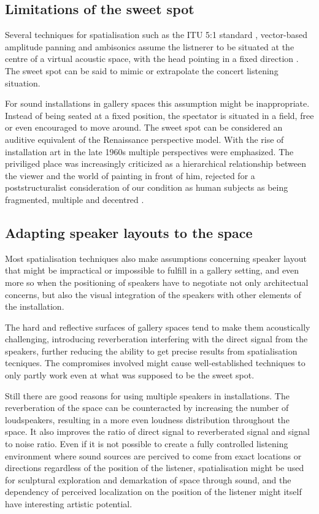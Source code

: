 \documentclass{article}
\begin{document}
\subsection{Limitations of the sweet spot}

Several techniques for spatialisation such as the ITU 5:1 standard \cite{ITU:1993_surround_5:1}, vector-based amplitude panning \cite{Pulkki:1997vbap} and ambisonics \cite{Gerzon:1985ambi_broadcast,Gerzon:1992metatheory} assume the listnerer to be situated at the centre of a virtual acoustic space, with the head pointing in a fixed direction \cite{Wishart:1996sonic_art}. The sweet spot can be said to mimic or extrapolate the concert listening situation.

For sound installations in gallery spaces this assumption might be inappropriate. Instead of being seated at a fixed position, the spectator is situated in a field, free or even encouraged to move around. The sweet spot can be considered an auditive equivalent of the Renaissance perspective model. With the rise of installation art in the late 1960s multiple perspectives were emphasized. The priviliged place was increasingly criticized as a hierarchical relationship between the viewer and the world of painting in front of him, rejected for a poststructuralist consideration of our condition as human subjects as being fragmented, multiple and decentred \cite{Bishop:2005installation}.


\subsection{Adapting speaker layouts to the space}

Most spatialisation techniques also make assumptions concerning speaker layout that might be impractical or impossible to fulfill in a gallery setting, and even more so when the positioning of speakers have to negotiate not only architectual concerns, but also the visual integration of the speakers with other elements of the installation.

The hard and reflective surfaces of gallery spaces tend to make them acoustically challenging, introducing reverberation interfering with the direct signal from the speakers, further reducing the ability to get precise results from spatialisation tecniques. The compromises involved might cause well-established techniques to only partly work even at what was supposed to be the sweet spot.

Still there are good reasons for using multiple speakers in installations. The reverberation of the space can be counteracted by increasing the number of loudspeakers, resulting in a more even loudness distribution throughout the space. It also improves the ratio of direct signal to reverberated signal and signal to noise ratio. Even if it is not possible to create a fully controlled listening environment where sound sources are percived to come from exact locations or directions regardless of the position of the listener, spatialisation might be used for sculptural exploration and demarkation of space through sound, and the dependency of perceived localization on the position of the listener might itself have interesting artistic potential.
\end{document}
